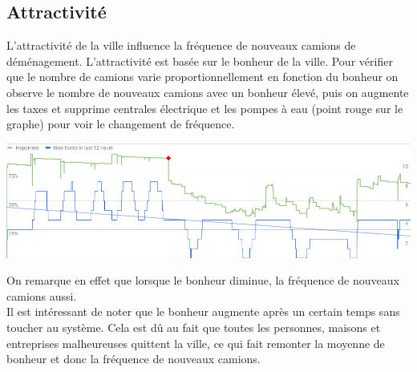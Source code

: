 \documentclass[11pt]{report}
\begin{document}
\subsection{Attractivité}
L'attractivité de la ville influence la fréquence de nouveaux camions de déménagement. L'attractivité est basée sur le bonheur de la ville.
Pour vérifier que le nombre de camions varie proportionnellement en fonction du bonheur on observe le nombre de nouveaux camions avec un bonheur élevé, puis on augmente les taxes et supprime centrales électrique et les pompes à eau (point rouge sur le graphe) pour voir le changement de fréquence.
\begin{center}
	\includegraphics[width=\textwidth]{happiness_new_trucks}
\end{center}
On remarque en effet que lorsque le bonheur diminue, la fréquence de nouveaux camions aussi.\\
Il est intéressant de noter que le bonheur augmente après un certain temps sans toucher au système. Cela est dû au fait que toutes les personnes, maisons et entreprises malheureuses quittent la ville, ce qui fait remonter la moyenne de bonheur et donc la fréquence de nouveaux camions.


\newpage
\end{document}
